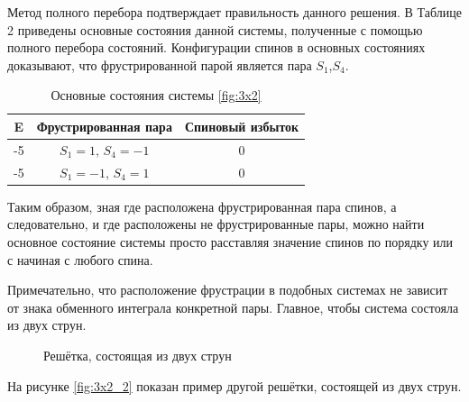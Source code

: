 \documentclass[utf8, babel, sor, jor, amsmath, amssymb, reprint]{elsarticle} %
\begin{document}
Метод полного перебора подтверждает правильность данного решения. В Таблице 2 приведены основные состояния данной системы, полученные с помощью полного перебора состояний. Конфигурации спинов в основных состояниях доказывают, что фрустрированной парой является пара $S_1$,$S_4$. 

\begin{table}[h]
	\centering
	\begin{tabular}{|c|c|c|}
		\hline
		 E   &   Фрустрированная пара & Спиновый избыток\\
		 \hline
		-5   &  $S_1=1$, $S_4=-1$ & 0 \\
		\hline
		-5   &   $S_1=-1$, $S_4=1$ & 0 \\
		\hline
	\end{tabular}
	\caption{Основные состояния системы \eqref{fig:3x2} }
	\label{tab:gs}
\end{table}

Таким образом, зная где расположена фрустрированная пара спинов, а следовательно, и где расположены не фрустрированные пары, можно найти основное состояние системы просто расставляя значение спинов по порядку или с начиная с любого спина. 

Примечательно, что расположение фрустрации в подобных системах не зависит от знака обменного интеграла конкретной пары. Главное, чтобы система состояла из двух струн.

\begin{figure}[h]
	\centering
	\caption{Решётка, состоящая из двух струн}
	\label{fig:3x2_2}
\end{figure}

На рисунке \eqref{fig:3x2_2} показан пример другой решётки, состоящей из двух струн.
\end{document}
